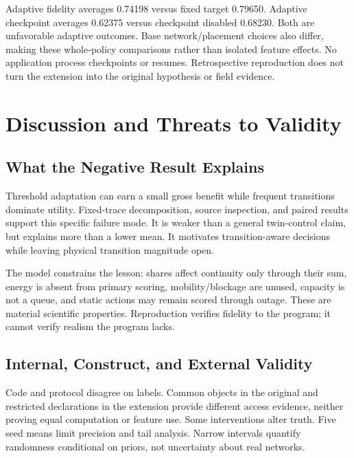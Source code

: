 \begin{table}[t]
\caption{Revised held-out results, five seeds. Do not pool with Table~\ref{tab:heldout}.}\label{tab:revised}
\centering\scriptsize
\end{table}

Adaptive fidelity averages 0.74198 versus fixed target 0.79650. Adaptive checkpoint averages 0.62375 versus checkpoint disabled 0.68230. Both are unfavorable adaptive outcomes. Base network/placement choices also differ, making these whole-policy comparisons rather than isolated feature effects. No application process checkpoints or resumes. Retrospective reproduction does not turn the extension into the original hypothesis or field evidence.

\section{Discussion and Threats to Validity}
\subsection{What the Negative Result Explains}
Threshold adaptation can earn a small gross benefit while frequent transitions dominate utility. Fixed-trace decomposition, source inspection, and paired results support this specific failure mode. It is weaker than a general twin-control claim, but explains more than a lower mean. It motivates transition-aware decisions while leaving physical transition magnitude open.

The model constrains the lesson: shares affect continuity only through their sum, energy is absent from primary scoring, mobility/blockage are unused, capacity is not a queue, and static actions may remain scored through outage. These are material scientific properties. Reproduction verifies fidelity to the program; it cannot verify realism the program lacks.

\subsection{Internal, Construct, and External Validity}
Code and protocol disagree on labels. Common objects in the original and restricted declarations in the extension provide different access evidence, neither proving equal computation or feature use. Some interventions alter truth. Five seed means limit precision and tail analysis. Narrow intervals quantify randomness conditional on priors, not uncertainty about real networks.

